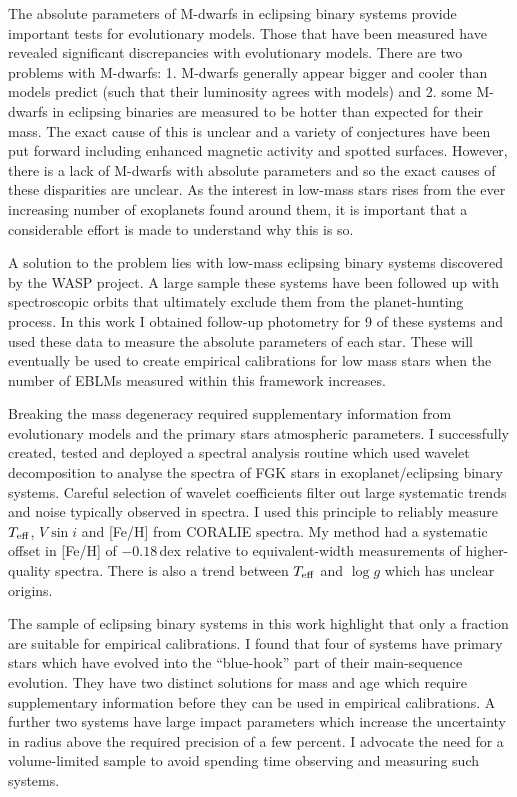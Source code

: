 
The absolute parameters of M-dwarfs in eclipsing binary systems provide important tests for evolutionary models. Those that have been measured have revealed significant discrepancies with evolutionary models. There are two problems with M-dwarfs: 1. M-dwarfs generally appear bigger and cooler than models predict (such that their luminosity agrees with models) and 2. some M-dwarfs in eclipsing binaries are measured to be hotter than expected for their mass. The exact cause of this is unclear and a variety of conjectures have been put forward including enhanced magnetic activity and spotted surfaces. However, there is a lack of M-dwarfs with absolute parameters and so the exact causes of these disparities are unclear. As the interest in low-mass stars rises from the ever increasing number of exoplanets found around them, it is important that a considerable effort is made to understand why this is so.


A solution to the problem lies with low-mass eclipsing binary systems discovered by the WASP project. A large sample these systems have been followed up with spectroscopic orbits that ultimately exclude them from the planet-hunting process. In this work I obtained follow-up photometry for 9 of these systems and used these data to measure the absolute parameters of each star. These will eventually be used to create empirical calibrations for low mass stars when the number of EBLMs measured within this framework increases.

Breaking the mass degeneracy required supplementary information from evolutionary models and the primary stars atmospheric parameters. I successfully created, tested and deployed a spectral analysis routine which used wavelet decomposition to analyse the spectra of FGK stars in exoplanet/eclipsing binary systems. Careful selection of wavelet coefficients filter out large systematic trends and noise typically observed in spectra. I used this principle to reliably measure $T_{\rm eff}$, $V \sin i$ and [Fe/H] from CORALIE spectra. My method had a systematic offset in [Fe/H] of $-0.18$\,dex relative to equivalent-width measurements of higher-quality spectra. There is also a trend between $T_{\rm eff}$ and $\log g$ which has unclear origins.


The sample of eclipsing binary systems in this work highlight that only a fraction are suitable for empirical calibrations. I found that four of systems have primary stars which have evolved into the ``blue-hook'' part of their main-sequence evolution. They have two distinct solutions for mass and age which require supplementary information before they can be used in empirical calibrations. A further two systems have large impact parameters which increase the uncertainty in radius above the required precision of a few percent. I advocate the need for a volume-limited sample to avoid spending time observing and measuring such systems.

